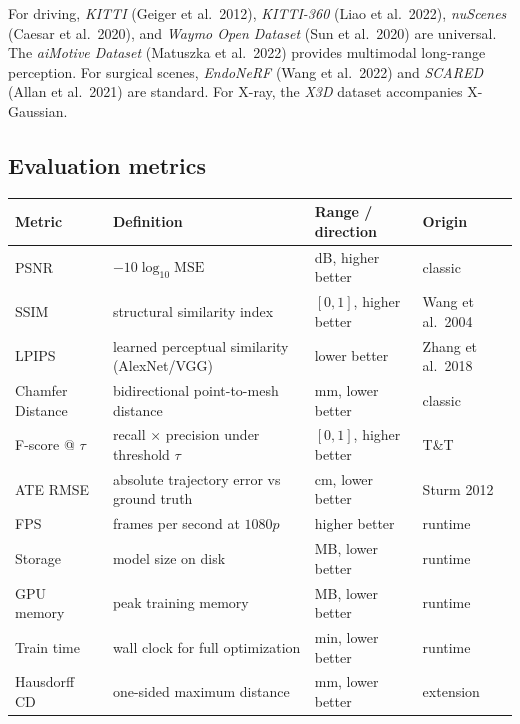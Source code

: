 For driving, \emph{KITTI} (Geiger et al.~2012), \emph{KITTI-360} (Liao et al.~2022), \emph{nuScenes} (Caesar et al.~2020), and \emph{Waymo Open Dataset} (Sun et al.~2020) are universal. The \emph{aiMotive Dataset} (Matuszka et al.~2022) provides multimodal long-range perception. For surgical scenes, \emph{EndoNeRF} (Wang et al.~2022) and \emph{SCARED} (Allan et al.~2021) are standard. For X-ray, the \emph{X3D} dataset accompanies X-Gaussian.

\subsection{Evaluation metrics}\label{evaluation-metrics}

{\def\LTcaptype{none} %
\begin{longtable}[]{@{}
  >{\raggedright\arraybackslash}p{}
  >{\raggedright\arraybackslash}p{}
  >{\raggedright\arraybackslash}p{}
  >{\raggedright\arraybackslash}p{}@{}}
\toprule\noalign{}
\begin{minipage}[b]{\linewidth}\raggedright
\textbf{Metric}
\end{minipage} & \begin{minipage}[b]{\linewidth}\raggedright
\textbf{Definition}
\end{minipage} & \begin{minipage}[b]{\linewidth}\raggedright
\textbf{Range / direction}
\end{minipage} & \begin{minipage}[b]{\linewidth}\raggedright
\textbf{Origin}
\end{minipage} \\
\midrule\noalign{}
\endhead
\bottomrule\noalign{}
\endlastfoot
PSNR & \(-10\log_{10}\mathrm{MSE}\) & dB, higher better & classic \\
SSIM & structural similarity index & \([0,1]\), higher better & Wang et al.~2004 \\
LPIPS & learned perceptual similarity (AlexNet/VGG) & lower better & Zhang et al.~2018 \\
Chamfer Distance & bidirectional point-to-mesh distance & mm, lower better & classic \\
F-score @ \(\tau\) & recall × precision under threshold \(\tau\) & \([0,1]\), higher better & T\&T \\
ATE RMSE & absolute trajectory error vs ground truth & cm, lower better & Sturm 2012 \\
FPS & frames per second at \(1080p\) & higher better & runtime \\
Storage & model size on disk & MB, lower better & runtime \\
GPU memory & peak training memory & MB, lower better & runtime \\
Train time & wall clock for full optimization & min, lower better & runtime \\
Hausdorff CD & one-sided maximum distance & mm, lower better & extension \\
\end{longtable}
}

